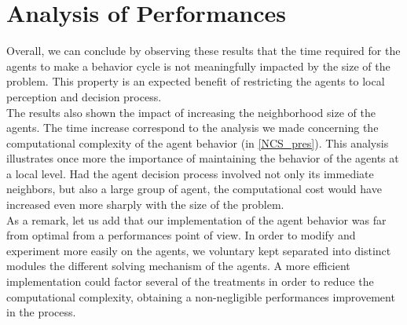 \section{Analysis of Performances}

Overall, we can conclude by observing these results that the time required for the agents to make a behavior cycle is not meaningfully impacted by the size of the problem. This property is an expected benefit of restricting the agents to local perception and decision process.\\
The results also shown the impact of increasing the neighborhood size of the agents. The time increase correspond to the analysis we made concerning the computational complexity of the agent behavior (in \ref{NCS_pres}). This analysis illustrates once more the importance of maintaining the behavior of the agents at a local level. Had the agent decision process involved not only its immediate neighbors, but also a large group of agent, the computational cost would have increased even more sharply with the size of the problem.\\
As a remark, let us add that our implementation of the agent behavior was far from optimal from a performances point of view. In order to modify and experiment more easily on the agents, we voluntary kept separated into distinct modules the different solving mechanism of the agents. A more efficient implementation could factor several of the treatments in order to reduce the computational complexity, obtaining a non-negligible performances improvement in the process.
